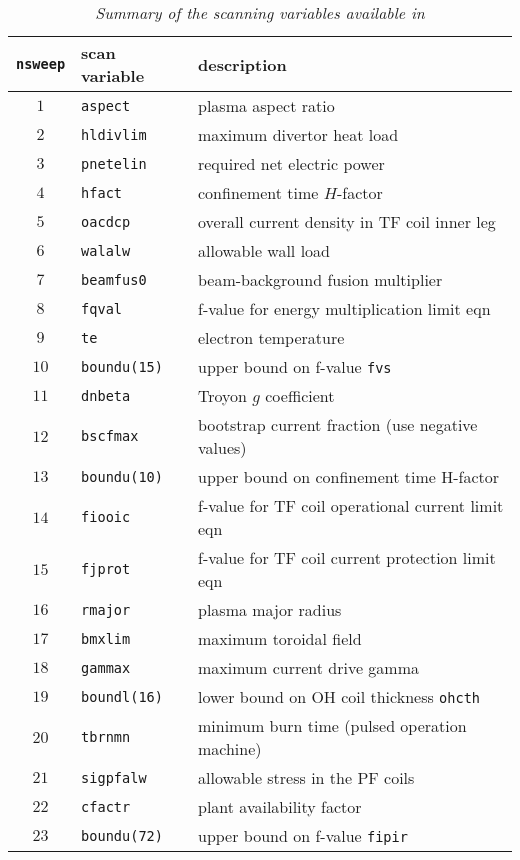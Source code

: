 
\begin{table}[tbph]
\begin{center}

\begin{tabular}{||c|l|l||} \hline
{\tt nsweep} & scan variable & description \\ \hline
$1 $ & \tt aspect     & plasma aspect ratio \\
$2 $ & \tt hldivlim   & maximum divertor heat load \\
$3 $ & \tt pnetelin   & required net electric power \\
$4 $ & \tt hfact      & confinement time $H$-factor \\
$5 $ & \tt oacdcp     & overall current density in TF coil inner leg \\
$6 $ & \tt walalw     & allowable wall load \\
$7 $ & \tt beamfus0   & beam-background fusion multiplier \\
$8 $ & \tt fqval      & f-value for energy multiplication limit eqn \\
$9 $ & \tt te         & electron temperature \\
$10$ & \tt boundu(15) & upper bound on f-value {\tt fvs} \\
$11$ & \tt dnbeta     & Troyon $g$ coefficient \\
$12$ & \tt bscfmax    & bootstrap current fraction (use negative values) \\
$13$ & \tt boundu(10) & upper bound on confinement time H-factor \\
$14$ & \tt fiooic     & f-value for TF coil operational current limit eqn \\
$15$ & \tt fjprot     & f-value for TF coil current protection limit eqn \\
$16$ & \tt rmajor     & plasma major radius \\
$17$ & \tt bmxlim     & maximum toroidal field \\
$18$ & \tt gammax     & maximum current drive gamma \\
$19$ & \tt boundl(16) & lower bound on OH coil thickness {\tt ohcth} \\
$20$ & \tt tbrnmn     & minimum burn time (pulsed operation machine) \\
$21$ & \tt sigpfalw   & allowable stress in the PF coils \\
$22$ & \tt cfactr     & plant availability factor \\ 
$23$ & \tt boundu(72) & upper bound on f-value {\tt fipir} \\ \hline
\end{tabular}
\end{center}
\caption[TABLE_SCANS]{{\it
Summary of the scanning variables available in \PSD }}
\label{tab:scans}
\end{table}
